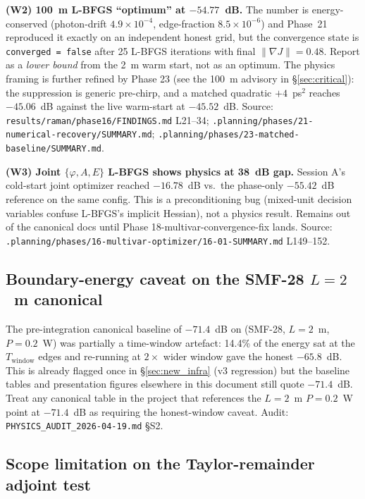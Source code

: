 \documentclass[12pt,a4paper]{article}
\theoremstyle{definition}
\begin{document}
\textbf{(W2) 100~m L-BFGS ``optimum'' at $-54.77$~dB.}
The number is energy-conserved (photon-drift $4.9 \times 10^{-4}$,
edge-fraction $8.5 \times 10^{-6}$) and Phase~21 reproduced it
exactly on an independent honest grid, but the convergence state is
\texttt{converged = false} after 25 L-BFGS iterations with final
$\|\nabla J\| = 0.48$. Report as a \emph{lower bound} from the
2~m warm start, not as an optimum. The physics framing is further
refined by Phase 23 (see the 100~m advisory in §\ref{sec:critical}):
the suppression is generic pre-chirp, and
a matched quadratic $+4$~ps$^2$ reaches $-45.06$~dB against the live
warm-start at $-45.52$~dB. Source:
\texttt{results/raman/phase16/FINDINGS.md} L21--34;
\texttt{.planning/phases/21-numerical-recovery/SUMMARY.md};
\texttt{.planning/phases/23-matched-baseline/SUMMARY.md}.

\textbf{(W3) Joint $\{\varphi, A, E\}$ L-BFGS shows physics at 38~dB gap.}
Session A's cold-start joint optimizer reached $-16.78$~dB vs.\ the
phase-only $-55.42$~dB reference on the same config. This is a
preconditioning bug (mixed-unit decision variables confuse L-BFGS's
implicit Hessian), not a physics result. Remains out of the canonical
docs until Phase 18-multivar-convergence-fix lands. Source:
\texttt{.planning/phases/16-multivar-optimizer/16-01-SUMMARY.md} L149--152.

\subsection{Boundary-energy caveat on the SMF-28 $L = 2$~m canonical}
\label{sec:april-boundary}

The pre-integration canonical baseline of $-71.4$~dB on
(SMF-28, $L{=}2$~m, $P{=}0.2$~W) was partially a time-window
artefact: 14.4\% of the energy sat at the $T_\text{window}$ edges
and re-running at $2\times$ wider window gave the honest $-65.8$~dB.
This is already flagged once in \S\ref{sec:new_infra} (v3
regression) but the baseline tables and presentation figures
elsewhere in this document still quote $-71.4$~dB. Treat any
canonical table in the project that references the $L{=}2$~m
$P{=}0.2$~W point at $-71.4$~dB as requiring the honest-window
caveat. Audit: \texttt{PHYSICS\_AUDIT\_2026-04-19.md} §S2.

\subsection{Scope limitation on the Taylor-remainder adjoint test}
\label{sec:april-taylor}
\end{document}
